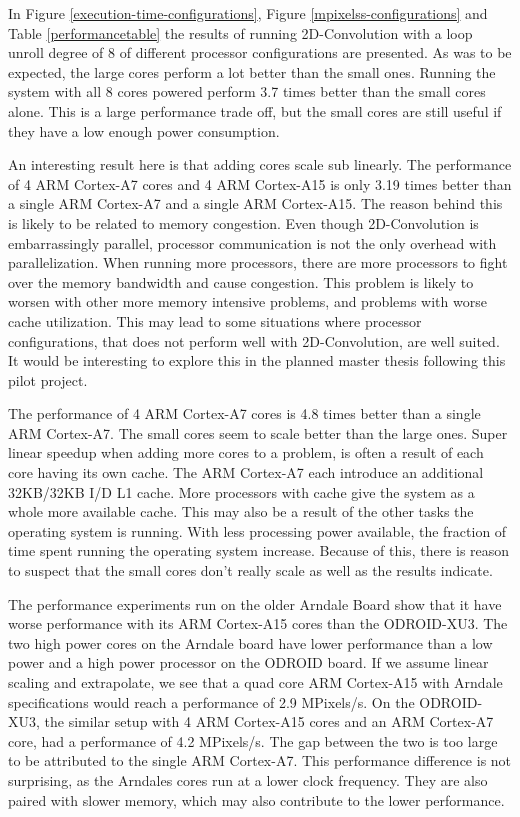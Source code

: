 In Figure \ref{execution-time-configurations}, Figure \ref{mpixelss-configurations} and Table \ref{performancetable} the results of running 2D-Convolution with a loop unroll degree of 8 of different processor configurations are presented.
As was to be expected, the large cores perform a lot better than the small ones.
Running the system with all 8 cores powered perform 3.7 times better than the small cores alone.
This is a large performance trade off, but the small cores are still useful if they have a low enough power consumption.

An interesting result here is that adding cores scale sub linearly.
The performance of 4 ARM Cortex-A7 cores and 4 ARM Cortex-A15 is only 3.19 times better than a single ARM Cortex-A7 and a single ARM Cortex-A15.
The reason behind this is likely to be related to memory congestion.
Even though 2D-Convolution is embarrassingly parallel, processor communication is not the only overhead with parallelization.
When running more processors, there are more processors to fight over the memory bandwidth and cause congestion.
This problem is likely to worsen with other more memory intensive problems, and problems with worse cache utilization.
This may lead to some situations where processor configurations, that does not perform well with 2D-Convolution, are well suited.
It would be interesting to explore this in the planned master thesis following this pilot project.

The performance of 4 ARM Cortex-A7 cores is 4.8 times better than a single ARM Cortex-A7.
The small cores seem to scale better than the large ones.
Super linear speedup when adding more cores to a problem, is often a result of each core having its own cache.
The ARM Cortex-A7 each introduce an additional 32KB/32KB I/D L1 cache.
More processors with cache give the system as a whole more available cache.
This may also be a result of the other tasks the operating system is running.
With less processing power available, the fraction of time spent running the operating system increase.
Because of this, there is reason to suspect that the small cores don't really scale as well as the results indicate.

The performance experiments run on the older Arndale Board show that it have worse performance with its ARM Cortex-A15 cores than the ODROID-XU3.
The two high power cores on the Arndale board have lower performance than a low power and a high power processor on the ODROID board.
If we assume linear scaling and extrapolate, we see that a quad core ARM Cortex-A15 with Arndale specifications would reach a performance of 2.9 MPixels/s.
On the ODROID-XU3, the similar setup with 4 ARM Cortex-A15 cores and an ARM Cortex-A7 core, had a performance of 4.2 MPixels/s.
The gap between the two is too large to be attributed to the single ARM Cortex-A7.
This performance difference is not surprising, as the Arndales cores run at a lower clock frequency.
They are also paired with slower memory, which may also contribute to the lower performance.

